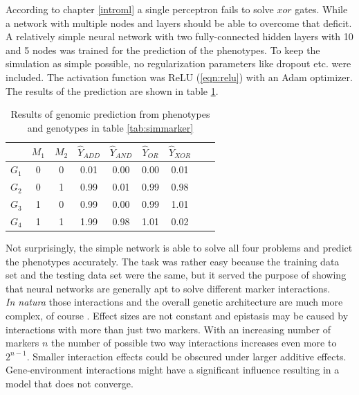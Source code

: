 According to chapter \ref{introml} a single perceptron fails to solve $xor$ gates. While a
network with multiple nodes and layers should be able to overcome that deficit. A
relatively simple neural network with two fully-connected hidden layers with 10 and 5
nodes was trained for the prediction of the phenotypes. To keep the simulation as simple
possible, no regularization parameters like dropout etc. were included. The activation
function was ReLU (\ref{eqn:relu}) with an Adam optimizer. The results of the prediction
are shown in table \ref{tab:simgpres}.

\begin{table}[H]
\caption{Results of genomic prediction from phenotypes and genotypes in table \ref{tab:simmarker}}
\label{tab:simgpres}
\centering
\begin{tabular}{ l c c | c c c c c c }
 \toprule
 & $M_1$ & $M_2$ & $\hat{Y}_{ADD}$ & $\hat{Y}_{AND}$ & $\hat{Y}_{OR}$ & $\hat{Y}_{XOR}$\\
 \midrule
 \hline 
 $G_1$ & 0 & 0 & 0.01 & 0.00 & 0.00 & 0.01 \\
 $G_2$ & 0 & 1 & 0.99 & 0.01 & 0.99 & 0.98 \\
 $G_3$ & 1 & 0 & 0.99 & 0.00 & 0.99 & 1.01 \\
 $G_4$ & 1 & 1 & 1.99 & 0.98 & 1.01 & 0.02 \\
 \bottomrule
\end{tabular}
\end{table}

Not surprisingly, the simple network is able to solve all four problems and predict the
phenotypes accurately. The task was rather easy because the training data set and the
testing data set were the same, but it served the purpose of showing that neural networks
are generally apt to solve different marker interactions. \\
\textit{In natura} those interactions and the overall genetic architecture are much more
complex, of course . Effect sizes are not constant and epistasis may be caused by
interactions with more than just two markers. With an increasing number of markers $n$ the
number of possible two way interactions increases even more to $2^{n-1}$. Smaller
interaction effects could be obscured under larger additive effects. Gene-environment
interactions might have a significant influence resulting in a model that does not
converge.


